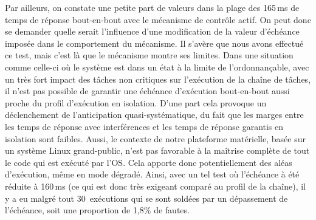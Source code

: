 \documentclass[french, a4paper, 11pt, twoside, pdftex]{StyleThese}
\begin{document}
Par ailleurs, on constate une petite part de valeurs dans la plage des 165\,ms de temps de réponse bout-en-bout avec le mécanisme de contrôle actif. On peut donc se demander quelle serait l'influence d'une modification de la valeur d'échéance imposée dans le comportement du mécanisme. Il s'avère que nous avons effectué ce test, mais c'est là que le mécanisme montre ses limites. Dans une situation comme celle-ci où le système est dans un état à la limite de l'ordonnançable, avec un très fort impact des tâches non critiques sur l'exécution de la chaîne de tâches, il n'est pas possible de garantir une échéance d'exécution bout-en-bout aussi proche du profil d'exécution en isolation. D'une part cela provoque un déclenchement de l'anticipation quasi-systématique, du fait que les marges entre les temps de réponse avec interférences et les temps de réponse garantis en isolation sont faibles. Aussi, le contexte de notre plateforme matérielle, basée sur un système Linux grand-public, n'est pas favorable à la maîtrise complète de tout le code qui est exécuté par l'OS. Cela apporte donc potentiellement des aléas d'exécution, même en mode dégradé.
Ainsi, avec un tel test où l'échéance à été réduite à 160\,ms (ce qui est donc très exigeant comparé au profil de la chaîne), il y a eu malgré tout 30~exécutions qui se sont soldées par un dépassement de l'échéance, soit une proportion de 1,8\% de fautes.




\ifdefined{}
\else


\end{document}
